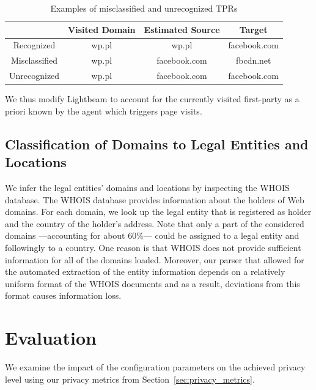 \documentclass[compsoc, conference, letterpaper, 10pt, times]{IEEEtran}
\begin{document}
\begin{table}
\centering
\footnotesize
\begin{tabular}{|c|c c c|}

\hline
& Visited Domain & Estimated Source & Target \\
\hline
Recognized & wp.pl & wp.pl & facebook.com \\
Misclassified & wp.pl & facebook.com & fbcdn.net \\
Unrecognized & wp.pl & facebook.com & facebook.com \\
\hline
\end{tabular}
\caption{Examples of misclassified and unrecognized TPRs}
\label{table:false_positive_examples}
\end{table}


We thus modify Lightbeam to account for the currently visited first-party as a priori known by the agent which triggers page visits.








\subsection{Classification of Domains to Legal Entities and Locations}
We infer the legal entities' domains and locations by inspecting the WHOIS database. The WHOIS database provides information about the holders of Web domains. For each domain, we look up the legal entity that is registered as holder and the country of the holder's address. Note that only a part of the considered domains ---accounting for about 60\%--- could be assigned to a legal entity and followingly to a country. One reason is that WHOIS does not provide sufficient information for all of the domains loaded. Moreover, our parser that allowed for the automated extraction of the entity information depends on a relatively uniform format of the WHOIS documents and as a result, deviations from this format causes information loss.

\section{Evaluation}
\label{sec:evaluation}
We examine the impact of the configuration parameters on the achieved privacy level using our privacy metrics from Section~\ref{sec:privacy_metrics}.
\end{document}
